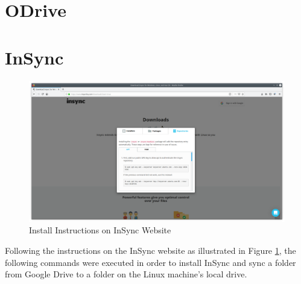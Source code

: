 \section{ODrive}
\section{InSync}
\begin{figure}[htb]
  \centering
  \includegraphics[scale=0.2]{images/insync0.png}
  \caption{Install Instructions on InSync Website}
  \label{fig:insync0}
\end{figure}
Following the instructions on the InSync website as illustrated in Figure \ref{fig:insync0}, the following commands were executed in order to install InSync and sync a folder from Google Drive to a folder on the Linux machine's local drive. \cite{insync}
